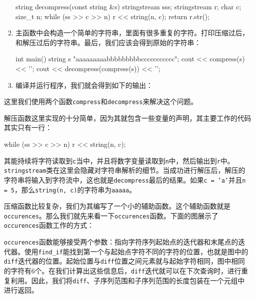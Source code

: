 \begin{enumerate}
\begin{codebox}[cpp]
string decompress(const string &s)
{
    stringstream ss{s};
    stringstream r;
    char c;
    size_t n;
    while (ss >> c >> n) { r << string(n, c); }
    return r.str();
}
\end{codebox}

\item 主函数中会构造一个简单的字符串，里面有很多重复的字符。打印压缩过后，和解压过后的字符串。最后，我们应该会得到原始的字符串：

\begin{codebox}[cpp]
int main()
{
    string s {"aaaaaaaaabbbbbbbbbccccccccccc"};
    cout << compress(s) << '\n';
    cout << decompress(compress(s)) << '\n';
}
\end{codebox}

\item 编译并运行程序，我们就会得到如下的输出：


\end{enumerate}


这里我们使用两个函数\texttt{compress}和\texttt{decompress}来解决这个问题。

解压函数这里实现的十分简单，因为其就包含一些变量的声明，其主要工作的代码其实只有一行：

\begin{codebox}[cpp]
while (ss >> c >> n) { r << string(n, c); }
\end{codebox}

其能持续将字符读取到\texttt{c}当中，并且将数字变量读取到\texttt{n}中，然后输出到\texttt{r}中。\texttt{stringstream}类在这里会隐藏对字符串解析的细节。当成功进行解压后，解压的字符串将输入到字符流中，这也就是\texttt{decompress}最后的结果。如果\texttt{c = 'a'}并且\texttt{n = 5}，那么\texttt{string(n, c)}的字符串为\texttt{aaaaa}。

压缩函数比较复杂，我们为其编写了一个小的辅助函数。这个辅助函数就是\texttt{occurences}。那么我们就先来看一下\texttt{occurences}函数。下面的图展示了\texttt{occurences}函数工作的方式：


\texttt{occurences}函数能够接受两个参数：指向字符序列起始点的迭代器和末尾点的迭代器。使用\texttt{find\_if}能找到第一个与起始点字符不同的字符的位置，也就是图中的\texttt{diff}迭代器的位置。起始位置与\texttt{diff}位置之间元素就与起始字符相同，图中相同的字符有6个。在我们计算出这些信息后，\texttt{diff}迭代就可以在下次查询时，进行重复利用。因此，我们将\texttt{diff}、子序列范围和子序列范围的长度包装在一个元组中进行返回。

